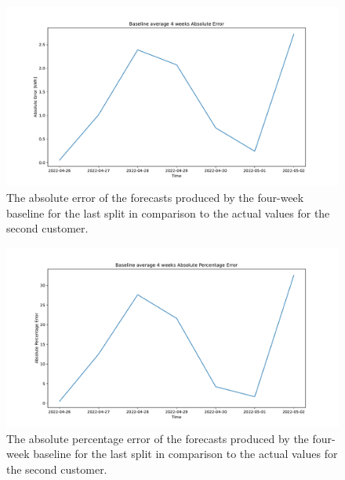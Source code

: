 \begin{figure}[H]
\centering
\includegraphics[width=1\textwidth]{images/baseline/baseline_average_4_weeks_daily_aggregated_mae}
\caption{The absolute error of the forecasts produced by the four-week baseline for the last split in comparison to the actual values for the second customer.}
\label{fig:baseline4weeksdailyforecastsmae}
\end{figure}

\begin{figure}[H]
\centering
\includegraphics[width=1\textwidth]{images/baseline/baseline_average_4_weeks_daily_aggregated_mape}
\caption{The absolute percentage error of the forecasts produced by the four-week baseline for the last split in comparison to the actual values for the second customer.}
\label{fig:baseline4weeksdailyforecastsmape}
\end{figure}
